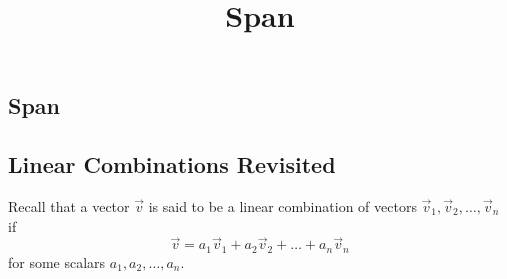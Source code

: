 \documentclass{ximera}
\title{Span} \license{CC BY-NC-SA 4.0}
\begin{document}
\begin{abstract}

\end{abstract}
\maketitle

\begin{onlineOnly}
\section*{Span}
\end{onlineOnly}

\subsection*{Linear Combinations Revisited}
Recall that a vector $\vec{v}$ is said to be a linear combination of vectors $\vec{v}_1, \vec{v}_2,\ldots, \vec{v}_n$ if 
$$\vec{v}=a_1\vec{v}_1+ a_2\vec{v}_2+\ldots + a_n\vec{v}_n$$
for some scalars $a_1, a_2, \ldots ,a_n$.
\end{document}
